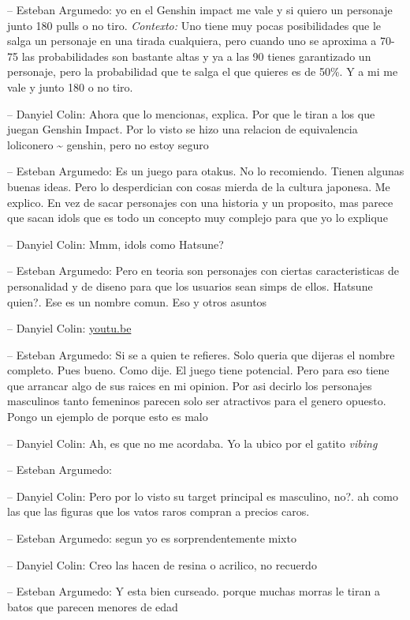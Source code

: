 -- Esteban Argumedo: yo en el Genshin impact me vale y si quiero un
personaje junto 180 pulls o no tiro. \emph{Contexto:} Uno tiene muy
pocas posibilidades que le salga un personaje en una tirada cualquiera,
pero cuando uno se aproxima a 70-75 las probabilidades son bastante
altas y ya a las 90 tienes garantizado un personaje, pero la
probabilidad que te salga el que quieres es de 50\%. Y a mi me vale y
junto 180 o no tiro.

-- Danyiel Colin: Ahora que lo mencionas, explica. Por que le tiran a
los que juegan Genshin Impact. Por lo visto se hizo una relacion de
equivalencia loliconero \textasciitilde{} genshin, pero no estoy seguro

-- Esteban Argumedo: Es un juego para otakus. No lo recomiendo. Tienen
algunas buenas ideas. Pero lo desperdician con cosas mierda de la
cultura japonesa. Me explico. En vez de sacar personajes con una
historia y un proposito, mas parece que sacan idols que es todo un
concepto muy complejo para que yo lo explique

-- Danyiel Colin: Mmm, idols como Hatsune?

-- Esteban Argumedo: Pero en teoria son personajes con ciertas
caracteristicas de personalidad y de diseno para que los usuarios sean
simps de ellos. Hatsune quien?. Ese es un nombre comun. Eso y otros
asuntos

-- Danyiel Colin: \href{https://youtu.be/widZEAJc0QM}{youtu.be}

-- Esteban Argumedo: Si se a quien te refieres. Solo queria que dijeras
el nombre completo. Pues bueno. Como dije. El juego tiene potencial.
Pero para eso tiene que arrancar algo de sus raices en mi opinion. Por
asi decirlo los personajes masculinos tanto femeninos parecen solo ser
atractivos para el genero opuesto. Pongo un ejemplo de porque esto es
malo

-- Danyiel Colin: Ah, es que no me acordaba. Yo la ubico por el gatito
\emph{vibing}

-- Esteban Argumedo:

-- Danyiel Colin: Pero por lo visto su target principal es masculino,
no?. ah como las que las figuras que los vatos raros compran a precios
caros.

-- Esteban Argumedo: segun yo es sorprendentemente mixto

-- Danyiel Colin: Creo las hacen de resina o acrilico, no recuerdo

-- Esteban Argumedo: Y esta bien curseado. porque muchas morras le tiran
a batos que parecen menores de edad

